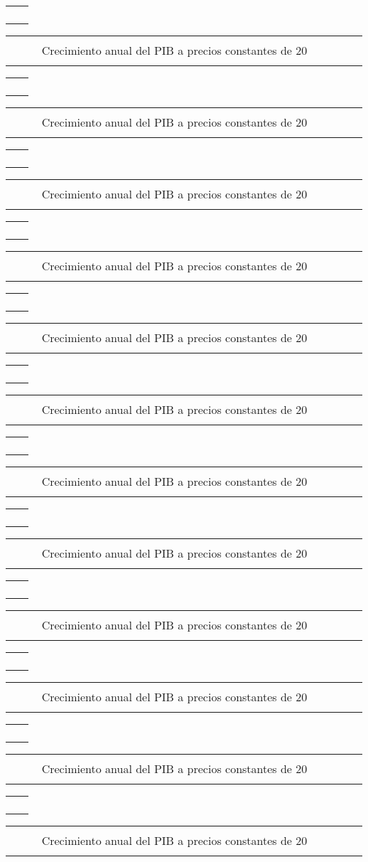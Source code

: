 \documentclass[12pt,letterpaper,twoside]{book}
\newcommand{\guiop}{}
\newcommand{\guicl}{}
\newlength{\distx}
\newcommand{\sectitle}{}
\newcounter{secnumber}[chapter]
\newcommand{\secnew}[1]{\stepcounter{secnumber}\renewcommand{\sectitle}{#1} \section{#1} { \raisebox{0pt}{\begin{titulo-subseccion-blanco} \Bold\large\sectitle\vphantom{p}\end{titulo-subseccion-blanco}}\\[-0.35cm]}}
\newcommand{\secnumbering}{{\large\Bold \thechapter.\thesecnumber}}
\newcommand{\hoja}[1]{\noindent\begin{fondo} #1 \end{fondo}\clearpage}
\newcommand{\cajita}[7]{\checkoddpage\ifoddpage
\begin{bloque-media}
\begin{titulo}
\begin{centrador}
	\begin{tabular}{p{2.5\distx}p{28.8\distx}}
	 & \\[-3mm]	
	 & {\begin{titulo-subseccion}\begin{numero-subseccion}\secnumbering \end{numero-subseccion}  \phantomsection{\secnew{#1}}  \end{titulo-subseccion}}  \\[-5mm]
	 &  \\[-1.3pt]
	\end{tabular}
\end{centrador}
\end{titulo}

\begin{tabular}{p{11\distx}p{21\distx}p{5\distx}}
		\begin{descripcion}
			#2
		\end{descripcion} 
	& 
		\begin{columna-central}
			\begin{subtitulo}
				\centering\footnotesize{\Bold #3} \\
				$\qquad\,\,$#4$\qquad\,\,$
			\end{subtitulo}
	
			\begin{grafica}\centering
				#5
			\end{grafica}
	
			\begin{fuente}
				\footnotesize #6 
			\end{fuente}
		\end{columna-central}
	& 
		\begin{columna-marginal}
			\begin{vacio1}
			
			\end{vacio1}
		
			\begin{nota}
				#7
			\end{nota}
		
			\begin{vacio2}
			
			\end{vacio2}
		\end{columna-marginal}
	\\
\end{tabular}
\end{bloque-media}
\else
\begin{bloque-media}
\begin{titulo}
\begin{centrador-par}
	\begin{tabular}{p{2.5\distx}p{28.8\distx}}
	 & \\[-3mm]	
	 & {\begin{titulo-subseccion}\begin{numero-subseccion}\centering\secnumbering\end{numero-subseccion}  \phantomsection{\secnew{#1}}  \end{titulo-subseccion}}  \\[-5mm]
	 &  \\[-1.3pt]
	\end{tabular}
\end{centrador-par}
\end{titulo}

\begin{tabular}{p{5\distx}p{21.36\distx}p{11\distx}}
		\begin{columna-marginal}
			\begin{vacio1}
			
			\end{vacio1}
		
			\begin{nota}
				#7
			\end{nota}
		
			\begin{vacio2}
			
			\end{vacio2}
		\end{columna-marginal}		
	& 
		\begin{columna-central}
			\begin{subtitulo}
				\centering\footnotesize{\Bold #3} \\
				$\qquad\,\,$#4$\qquad\,\,$
			\end{subtitulo}
	
			\begin{grafica}\centering
				#5
			\end{grafica}
	
			\begin{fuente}
				\footnotesize #6 
			\end{fuente}
		\end{columna-central}
	& 
		\begin{descripcion}
			#2
		\end{descripcion} 
	\\
\end{tabular}
\end{bloque-media}
\fi
}
\begin{document}
\hoja{
	\cajita{Producto Interno Bruto}{}{Crecímiento anual del PIB a precios constantes de 2001Crecimiento anual del PIB a precios constantes de 20}{ Crecimiento anual del PIB a precios constantes de 20}{\ \\[-4mm]\begin{tikzpicture}[x=1pt,y=1pt]
		
		\end{tikzpicture}} {Fuente: Banco de Guatemala \guiop BANGUAT \guicl)}{ }
	
	\cajita{Producto Interno Bruto}{}{Crecimiento anual del PIB a precios constantes de 2001Crecimiento anual del PIB a precios constantes de 20}{ Crecimiento anual del PIB a precios constantes de 20}{\ \\[-4mm]\begin{tikzpicture}[x=1pt,y=1pt]
		
		\end{tikzpicture}} {Fuente: Banco de Guatemala \guiop BANGUAT \guicl)}{ }
	
}

\hoja{
	\cajita{Producto Interno Bruto}{}{Crecímiento anual del PIB a precios constantes de 2001Crecimiento anual del PIB a precios constantes de 20}{ Crecimiento anual del PIB a precios constantes de 20}{\ \\[-4mm]\begin{tikzpicture}[x=1pt,y=1pt]
		
		\end{tikzpicture}} {Fuente: Banco de Guatemala \guiop BANGUAT \guicl)}{ }
	
	\cajita{Producto Interno Bruto}{}{Crecimiento anual del PIB a precios constantes de 2001Crecimiento anual del PIB a precios constantes de 20}{ Crecimiento anual del PIB a precios constantes de 20}{\ \\[-4mm]\begin{tikzpicture}[x=1pt,y=1pt]
		
		\end{tikzpicture}} {Fuente: Banco de Guatemala \guiop BANGUAT \guicl)}{ }
	
}

\hoja{
	\cajita{Producto Interno Bruto}{}{Crecímiento anual del PIB a precios constantes de 2001Crecimiento anual del PIB a precios constantes de 20}{ Crecimiento anual del PIB a precios constantes de 20}{\ \\[-4mm]\begin{tikzpicture}[x=1pt,y=1pt]
		
		\end{tikzpicture}} {Fuente: Banco de Guatemala \guiop BANGUAT \guicl)}{ }
	
	\cajita{Producto Interno Bruto}{}{Crecimiento anual del PIB a precios constantes de 2001Crecimiento anual del PIB a precios constantes de 20}{ Crecimiento anual del PIB a precios constantes de 20}{\ \\[-4mm]\begin{tikzpicture}[x=1pt,y=1pt]
		
		\end{tikzpicture}} {Fuente: Banco de Guatemala \guiop BANGUAT \guicl)}{ }
	
}






%
\end{document}
